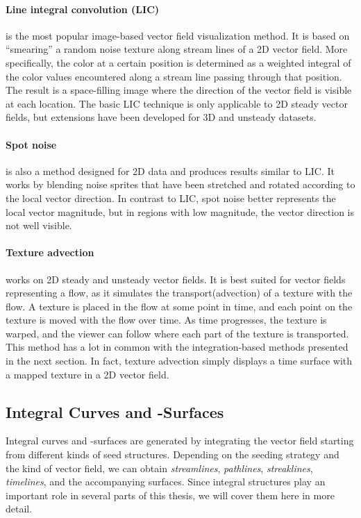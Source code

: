 %
\paragraph{Line integral convolution (\acs{LIC})} is the most
popular image-based vector field visualization method.
%
It is based on ``smearing'' a random noise texture along stream lines of a
\ac{2D} vector field.
%
More specifically, the color at a certain position is determined as a weighted
integral of the color values encountered along a stream line passing through
that position.
%
The result is a space-filling image where the direction of the vector field is
visible at each location.
%
The basic \ac{LIC} technique is only applicable to \ac{2D} steady vector fields,
but extensions have been developed for \ac{3D} and unsteady datasets.
%

%
\paragraph{Spot noise} is also a method designed for \ac{2D} data and produces
results similar to \ac{LIC}.
%
It works by blending noise sprites that have been stretched and rotated
according to the local vector direction.
%
In contrast to \ac{LIC}, spot noise better represents the local vector
magnitude, but in regions with low magnitude, the vector direction is not well
visible. 
%

%
\paragraph{Texture advection} works on \ac{2D} steady and unsteady vector
fields.
%
It is best suited for vector fields representing a flow, as it simulates the
transport(advection) of a texture with the flow.
%
A texture is placed in the flow at some point in time, and each point on the
texture is moved with the flow over time.
%
As time progresses, the texture is warped, and the viewer can follow where each
part of the texture is transported.
%
This method has a lot in common with the integration-based methods presented in
the next section.
%
In fact, texture advection simply displays a time surface with a mapped texture
in a \ac{2D} vector field.
%

%
%
\subsection{Integral Curves and -Surfaces} %
\label{sub:integral_curves_and_surfaces}
%
Integral curves and -surfaces are generated by integrating the vector field
starting from different kinds of seed structures.
%
Depending on the seeding strategy and the kind of vector field, we can obtain
\emph{streamlines}, \emph{pathlines}, \emph{streaklines}, \emph{timelines},
and the accompanying surfaces.
%
Since integral structures play an important role in several parts of this
thesis, we will cover them here in more detail.
%

